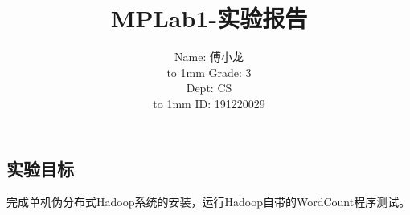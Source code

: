 \documentclass[a4paper,UTF8]{article}
\theoremstyle{definition}
\begin{document}
\begin{CJK}{UTF8}{gkai}
\title{MPLab1-实验报告}
\author{
    \begin{minipage}[b]{0.3\linewidth}
      \begin{flushright}
        Name: 傅小龙\\%
        \vbox to 1mm{}
        Grade: 3%
      \end{flushright}
    \end{minipage}
    \hfill
    \begin{minipage}[b]{0.3\linewidth}
      \begin{flushright}
        Dept: CS\\%
        \vbox to 1mm{}
        ID: 191220029%
      \end{flushright}
    \end{minipage}
}
\date{}
\maketitle


\begin{CJK*}{UTF8}{gbsn}
\section*{实验目标}
\end{CJK*}
\par 完成单机伪分布式Hadoop系统的安装，运行Hadoop自带的WordCount程序测试。
\begin{CJK*}{UTF8}{gbsn}

\end{CJK*}
\end{CJK}
\end{document}
